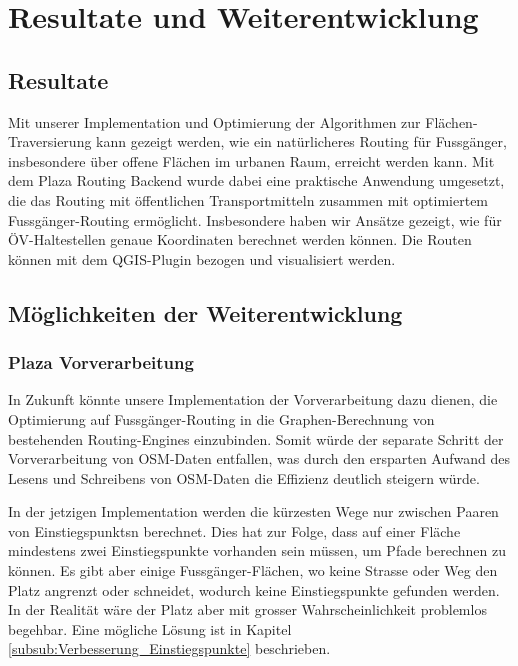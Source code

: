 
\section{Resultate und Weiterentwicklung}
\label{sec:Resultate und Weiterentwicklung}

\subsection{Resultate}
\label{sub:Resultate}

Mit unserer Implementation und Optimierung der Algorithmen zur Flächen-Traversierung kann gezeigt werden, wie ein natürlicheres Routing für Fussgänger, insbesondere über offene Flächen im urbanen Raum, erreicht werden kann. Mit dem Plaza Routing Backend wurde dabei eine praktische Anwendung umgesetzt, die das Routing mit öffentlichen Transportmitteln zusammen mit optimiertem Fussgänger-Routing ermöglicht. Insbesondere haben wir Ansätze gezeigt, wie für ÖV-Haltestellen genaue Koordinaten berechnet werden können. Die Routen können mit dem QGIS-Plugin bezogen und visualisiert werden.

\subsection{Möglichkeiten der Weiterentwicklung}
\label{sub:Möglichkeiten der Weiterentwicklung}


\subsubsection{Plaza Vorverarbeitung}
\label{subsub:Weiterentwicklung_Vorverarbeitung}

In Zukunft könnte unsere Implementation der Vorverarbeitung dazu dienen, die Optimierung auf Fussgänger-Routing in die Graphen-Berechnung von bestehenden Routing-Engines einzubinden. Somit würde der separate Schritt der Vorverarbeitung von \ac{OSM}-Daten entfallen, was durch den ersparten Aufwand des Lesens und Schreibens von \ac{OSM}-Daten die Effizienz deutlich steigern würde.

In der jetzigen Implementation werden die kürzesten Wege nur zwischen Paaren von \glspl{Einstiegspunkt}n berechnet. Dies hat zur Folge, dass auf einer Fläche mindestens zwei Einstiegspunkte vorhanden sein müssen, um Pfade berechnen zu können. Es gibt aber einige Fussgänger-Flächen, wo keine Strasse oder Weg den Platz angrenzt oder schneidet, wodurch keine Einstiegspunkte gefunden werden. In der Realität wäre der Platz aber mit grosser Wahrscheinlichkeit problemlos begehbar. Eine mögliche Lösung ist in Kapitel \ref{subsub:Verbesserung_Einstiegspunkte} beschrieben.

